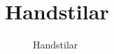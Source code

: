 \section{Handstilar}
\label{handstilar}

\begin{figure}
  \caption{Handstilar}
  \label{fig:bild_morse_8}
\end{figure}
